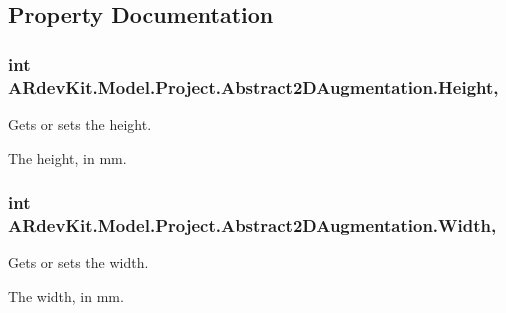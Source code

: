 \subsection{Property Documentation}
\hypertarget{class_a_rdev_kit_1_1_model_1_1_project_1_1_abstract2_d_augmentation_a14d016654e3824108d413c812f134539}{
\subsubsection[{Height}]{\setlength{\rightskip}{0pt plus 5cm}int A\-Rdev\-Kit.\-Model.\-Project.\-Abstract2\-D\-Augmentation.\-Height\hspace{0.3cm}{\ttfamily [get]}, {\ttfamily [set]}}}\label{class_a_rdev_kit_1_1_model_1_1_project_1_1_abstract2_d_augmentation_a14d016654e3824108d413c812f134539}


Gets or sets the height. 

The height, in mm. \hypertarget{class_a_rdev_kit_1_1_model_1_1_project_1_1_abstract2_d_augmentation_abbc74c285b3d91be5841ce16473e2cd6}{
\subsubsection[{Width}]{\setlength{\rightskip}{0pt plus 5cm}int A\-Rdev\-Kit.\-Model.\-Project.\-Abstract2\-D\-Augmentation.\-Width\hspace{0.3cm}{\ttfamily [get]}, {\ttfamily [set]}}}\label{class_a_rdev_kit_1_1_model_1_1_project_1_1_abstract2_d_augmentation_abbc74c285b3d91be5841ce16473e2cd6}


Gets or sets the width. 

The width, in mm. 